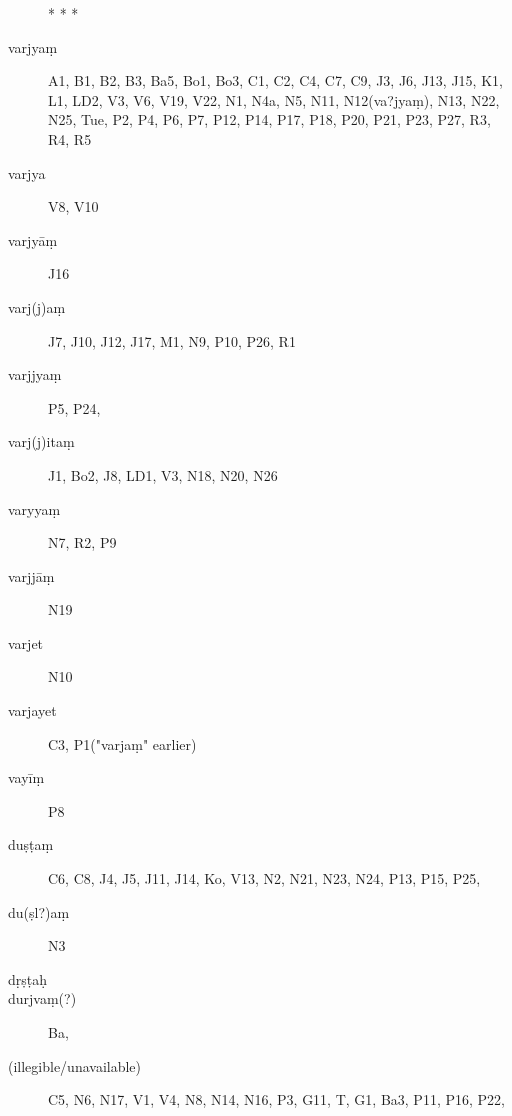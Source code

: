 \begin{ekdosis}
\begin{marma}[hp01_055]
\begin{marma}[hp01_060]
\begin{description}
* * *
\item[varjyaṃ] A1, B1, B2, B3, Ba5, Bo1, Bo3, C1, C2, C4, C7, C9, J3, J6, J13, J15, K1, L1, LD2, V3, V6, V19, V22, N1, N4a, N5, N11, N12(va?jyaṃ), N13, N22, N25, Tue, P2, P4, P6, P7, P12, P14, P17, P18, P20, P21, P23, P27, R3, R4, R5
\item[varjya] V8, V10
\item[varjyāṃ] J16
\item[varj(j)aṃ] J7, J10, J12, J17, M1, N9, P10, P26, R1
\item[varjjyaṃ]  P5, P24, 
\item[varj(j)itaṃ] J1, Bo2, J8, LD1, V3, N18, N20, N26
\item[varyyaṃ]   N7, R2, P9
\item[varjjāṃ]   N19
\item[varjet]  N10
\item[varjayet] C3, P1("varjaṃ" earlier)
\item[vayīṃ]   P8
\item[duṣṭaṃ] C6, C8, J4, J5, J11, J14, Ko, V13, N2, N21, N23, N24, P13, P15, P25, 
\item[du(ṣl?)aṃ]  N3
\item[dṛṣṭaḥ]
\item[durjvaṃ(?)] Ba,
\item[(illegible/unavailable)] C5, N6, N17, V1, V4, N8, N14, N16, P3, G11, T, G1, Ba3, P11, P16, P22,
    \end{description}
 \end{marma}



\end{marma}
\end{ekdosis}
